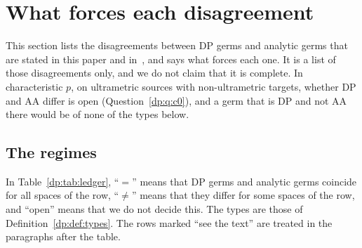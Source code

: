 \section{What forces each disagreement}\label{dp:sec:ledger}

This section lists the disagreements between DP germs and analytic germs that are stated in this paper and in~\cite{I}, and says what forces each one. It is a list of those disagreements only, and we do not claim that it is complete. In characteristic $p$, on ultrametric sources with non-ultrametric targets, whether DP and AA differ is open (Question~\ref{dp:q:c0}), and a germ that is DP and not AA there would be of none of the types below.

\subsection{The regimes}\label{dp:ssec:regimes}

In Table~\ref{dp:tab:ledger}, ``$=$'' means that DP germs and analytic germs coincide for all spaces of the row, ``$\ne$'' means that they differ for some spaces of the row, and ``open'' means that we do not decide this. The types are those of Definition~\ref{dp:def:types}. The rows marked ``see the text'' are treated in the paragraphs after the table.

